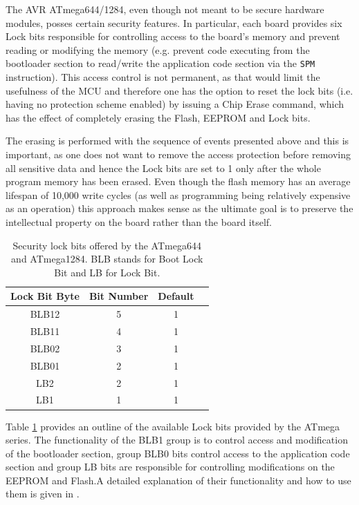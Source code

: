 \documentclass[10pt,a4paper,twocolumn]{article}
\begin{document}
	The AVR ATmega644/1284, even though not meant to be secure hardware modules, posses certain security features. In particular, each board provides six Lock bits responsible for controlling access to the board's memory and prevent reading or modifying the memory (e.g. prevent code executing from the bootloader section to read/write the application code section via the \texttt{SPM} instruction). This access control is not permanent, as that would limit the usefulness of the MCU and therefore one has the option to reset the lock bits (i.e. having no protection scheme enabled) by issuing a Chip Erase command, which has the effect of completely erasing the Flash, EEPROM and Lock bits.
	
	The erasing is performed with the sequence of events presented above and this is important, as one does not want to remove the access protection before removing all sensitive data and hence the Lock bits are set to 1 only after the whole program memory has been erased. Even though the flash memory has an average lifespan of 10,000 write cycles (as well as programming being relatively expensive as an operation) this approach makes sense as the ultimate goal is to preserve the intellectual property on the board rather than the board itself.
	
	\begin{table}
		\center
		\begin{tabular}{| c | c | c | c |}
			\hline
			\textbf{Lock Bit Byte} & \textbf{Bit Number} & \textbf{Default}\\
			\hline \hline
			BLB12 & 5 & 1\\
			BLB11 & 4 & 1\\
			BLB02 & 3 & 1\\
			BLB01 & 2 & 1\\
			LB2 & 2 & 1 \\
			LB1 & 1 & 1 \\
			\hline
		\end{tabular}
		\caption{Security lock bits offered by the ATmega644 and ATmega1284. BLB stands for Boot Lock Bit and LB for Lock Bit.}
		\label{table:lock_bits}
	\end{table}
	
Table \ref{table:lock_bits}	 provides an outline of the available Lock bits provided by the ATmega series. The functionality of the BLB1 group is to control access and modification of the bootloader section, group BLB0 bits control access to the application code section and group LB bits are responsible for controlling modifications on the EEPROM and Flash.A detailed explanation of their functionality and how to use them is given in \citep{atmega_manual}.
	
\end{document}
